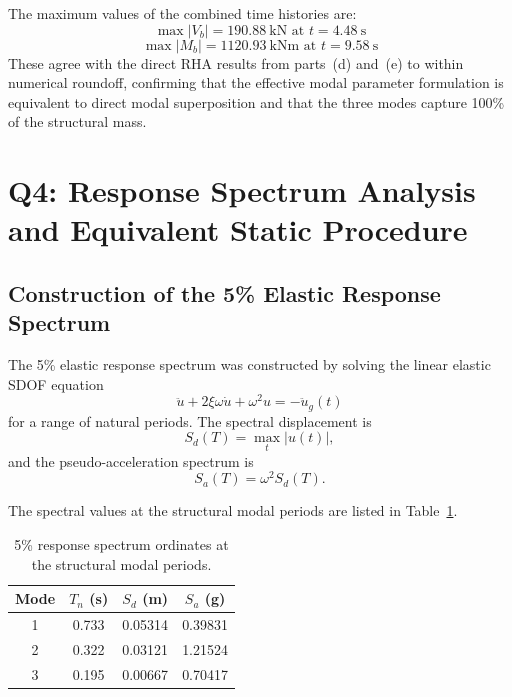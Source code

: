 \documentclass[11pt,a4paper]{article}
\begin{document}
The maximum values of the combined time histories are:
\begin{equation}
\boxed{\max|V_b| = 190.88\ \mathrm{kN} \text{ at } t = 4.48\ \mathrm{s}}
\end{equation}
\begin{equation}
\boxed{\max|M_b| = 1120.93\ \mathrm{kNm} \text{ at } t = 9.58\ \mathrm{s}}
\end{equation}
These agree with the direct RHA results from parts~(d) and~(e) to within numerical roundoff, confirming that the effective modal parameter formulation is equivalent to direct modal superposition and that the three modes capture 100\% of the structural mass.
\pagebreak
\section{Q4: Response Spectrum Analysis and Equivalent Static Procedure}

\subsection{Construction of the 5\% Elastic Response Spectrum}

The 5\% elastic response spectrum was constructed by solving the linear elastic SDOF equation
\begin{equation}
\ddot{u}+2\xi\omega\dot{u}+\omega^2u=-\ddot{u}_g(t)
\end{equation}
for a range of natural periods. The spectral displacement is
\begin{equation}
S_d(T)=\max_t|u(t)|,
\end{equation}
and the pseudo-acceleration spectrum is
\begin{equation}
S_a(T)=\omega^2S_d(T).
\end{equation}

The spectral values at the structural modal periods are listed in Table~\ref{tab:q4a_modal_spectrum}.

\begin{table}[H]
\centering
\caption{5\% response spectrum ordinates at the structural modal periods.}
\begin{tabular}{cccc}
\toprule
Mode & $T_n$ (s) & $S_d$ (m) & $S_a$ (g)\\
\midrule
1 & 0.733 & 0.05314 & 0.39831\\
2 & 0.322 & 0.03121 & 1.21524\\
3 & 0.195 & 0.00667 & 0.70417\\
\bottomrule
\end{tabular}
\label{tab:q4a_modal_spectrum}
\end{table}
\end{document}

